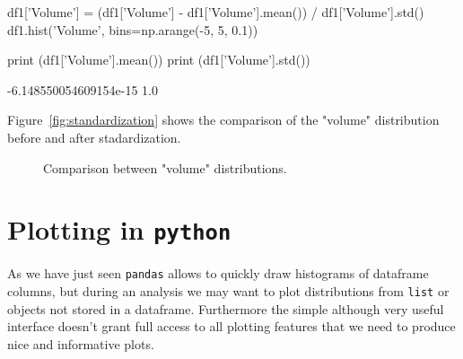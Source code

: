 \begin{ipython}
\begin{ipython}
df1['Volume'] = (df1['Volume'] - df1['Volume'].mean()) / df1['Volume'].std()
df1.hist('Volume', bins=np.arange(-5, 5, 0.1))

print (df1['Volume'].mean())
print (df1['Volume'].std())
\end{ipython}
\begin{ioutput}
-6.148550054609154e-15
1.0
\end{ioutput}

Figure~\ref{fig:standardization} shows the comparison of the "volume" distribution before and after stadardization.

\begin{figure}[htb]
	\centering
	\caption{Comparison between "volume" distributions.}
	\label{fig:dummy2}
\end{figure}

\section{Plotting in \texttt{python}}\label{plotting-in-python}

As we have just seen \texttt{pandas} allows to quickly draw histograms of dataframe columns, but during an analysis we may want to plot distributions from \texttt{list} or objects not stored in a dataframe. Furthermore the simple although very useful interface doesn't grant full access to all plotting features that we need to produce nice and informative plots.


\end{ipython}

